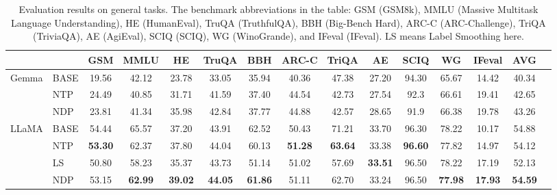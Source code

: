 
\begin{table}[htbp]
 \centering
\begin{tabular}{ll c c c c c c c c c c c c c}
\toprule
& & GSM & MMLU & HE &  TruQA & BBH & ARC-C & TriQA  &AE & SCIQ & WG & IFeval & AVG \\
\midrule
\multirow{3}{*}{Gemma} 
& BASE & 19.56 & 42.12 & 23.78 & 33.05 & 35.94 & 40.36 & 47.38 & 27.20 & 94.30 & 65.67 & 14.42 & 40.34 \\
& NTP & 24.49 & 40.85 & 31.71 & 41.59 & 37.40 & 44.54 & 42.73 & 27.54 & 92.3 & 66.61 & 19.41 & 42.65 \\
& NDP & 23.81 & 41.34 & 35.98 & 42.84 & 37.77 & 44.88 & 42.57 & 28.65 & 91.9 & 66.38 & 19.78 & 43.26 \\
\midrule
\multirow{4}{*}{LLaMA}
& BASE & 54.44 & 65.57 & 37.20 & 43.91 & 62.52 & 50.43 & 71.21 & 33.70 & 96.30 & 78.22 & 10.17 & 54.88 \\
& NTP & \textbf{53.30} & 62.37 & 37.80 & 44.04 & 60.13 & \textbf{51.28} & \textbf{63.64} & 33.38 & \textbf{96.60} & 77.82 & 14.97 & 54.12 \\
& LS & 50.80 & 58.23 & 35.37 & 43.73 & 51.14 & 51.02 & 57.69 & \textbf{33.51} & 96.50 & 78.22 & 17.19 & 52.13 \\
& NDP & 53.15 & \textbf{62.99} & \textbf{39.02} & \textbf{44.05} & \textbf{61.86} & 51.11 & 62.70 & 33.24 & 96.50 & \textbf{77.98} & \textbf{17.93} & \textbf{54.59} \\

\bottomrule
\end{tabular}
\caption{Evaluation results on general tasks. The benchmark abbreviations in the table: GSM (GSM8k), MMLU (Massive Multitask Language Understanding), HE (HumanEval), TruQA (TruthfulQA), BBH (Big-Bench Hard), ARC-C (ARC-Challenge), TriQA (TriviaQA), AE (AgiEval), SCIQ (SCIQ), WG (WinoGrande), and IFeval (IFeval). LS means Label Smoothing here.}
\label{tab:performance}
\end{table}